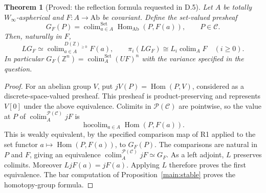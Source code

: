 \documentclass[11pt,a4paper]{article}
\newtheorem{theorem}{Theorem}[section]
\theoremstyle{definition}
\begin{document}
\begin{theorem}[Proved: the reflection formula requested in D.5]\label{main:reflection}
Let $A$ be totally $W_\infty$-aspherical and $F:A\to\mathrm{Ab}$ be
covariant. Define the set-valued presheaf
\[
 G_F(P)=\operatorname{colim}^{\mathrm{Set}}_{a\in A}
       \operatorname{Hom}_{\mathrm{Ab}}(P,F(a)),\qquad P\in\mathcal C.
\]
Then, naturally in $F$,
\[
 LG_F\simeq \operatorname{colim}^{D(\mathbb Z)_{\geq0}}_{a\in A}F(a),
 \qquad
 \pi_i(LG_F)\cong L_i\operatorname{colim}_A F\quad(i\geq0).
\]
In particular $G_F(\mathbb Z^n)=\operatorname{colim}^{\mathrm{Set}}_A(UF)^n$
with the variance specified in the question.
\end{theorem}
\begin{proof}
For an abelian group $V$, put $jV(P)=\operatorname{Hom}(P,V)$, considered
as a discrete-space-valued presheaf. This presheaf is product-preserving
and represents $V[0]$ under the above equivalence. Colimits in
$\mathcal P(\mathcal C)$ are pointwise, so the value at $P$ of
$\operatorname{colim}^{\mathcal P(\mathcal C)}_A jF$ is
\[
 \operatorname{hocolim}_{a\in A}\operatorname{Hom}(P,F(a)).
\]
This is weakly equivalent, by the specified comparison map of R1 applied
to the set functor $a\mapsto\operatorname{Hom}(P,F(a))$, to $G_F(P)$.
The comparisons are natural in $P$ and $F$, giving an equivalence
$\operatorname{colim}^{\mathcal P(\mathcal C)}_A jF\simeq G_F$.
As a left adjoint, $L$ preserves colimits. Moreover $LjF(a)=jF(a)$.
Applying $L$ therefore proves the first equivalence. The bar computation
of Proposition~\ref{main:stable} proves the homotopy-group formula.
\end{proof}
\end{document}
